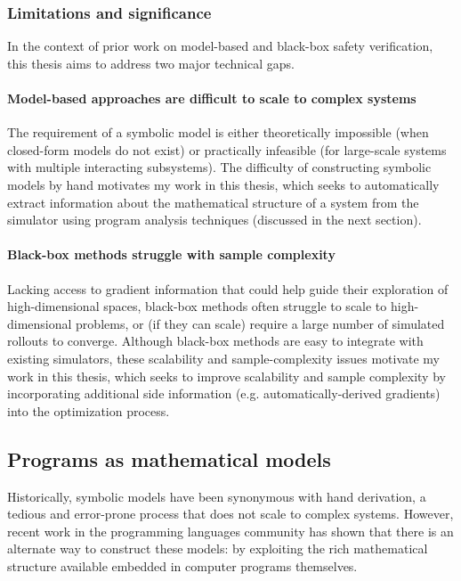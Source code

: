 \subsubsection{Limitations and significance}

In the context of prior work on model-based and black-box safety verification, this thesis aims to address two major technical gaps.

\paragraph{Model-based approaches are difficult to scale to complex systems} The requirement of a symbolic model is either theoretically impossible (when closed-form models do not exist) or practically infeasible (for large-scale systems with multiple interacting subsystems). The difficulty of constructing symbolic models by hand motivates my work in this thesis, which seeks to automatically extract information about the mathematical structure of a system from the simulator using program analysis techniques (discussed in the next section).

\paragraph{Black-box methods struggle with sample complexity} Lacking access to gradient information that could help guide their exploration of high-dimensional spaces, black-box methods often struggle to scale to high-dimensional problems, or (if they can scale) require a large number of simulated rollouts to converge. Although black-box methods are easy to integrate with existing simulators, these scalability and sample-complexity issues motivate my work in this thesis, which seeks to improve scalability and sample complexity by incorporating additional side information (e.g. automatically-derived gradients) into the optimization process.

\subsection{Programs as mathematical models}

Historically, symbolic models have been synonymous with hand derivation, a tedious and error-prone process that does not scale to complex systems. However, recent work in the programming languages community has shown that there is an alternate way to construct these models: by exploiting the rich mathematical structure available embedded in computer programs themselves.

